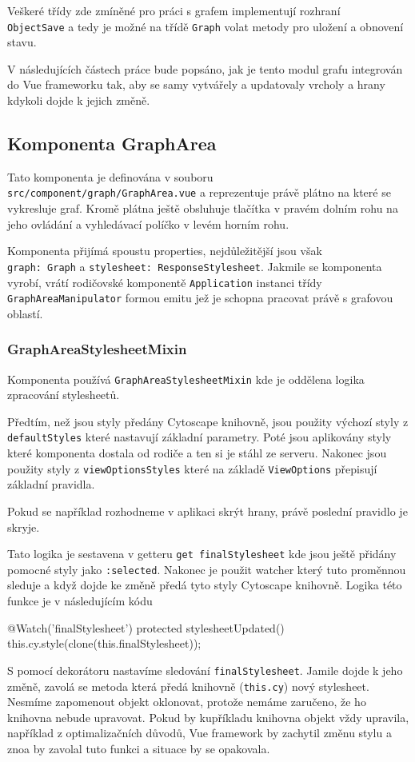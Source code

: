 \bigskip

Veškeré třídy zde zmíněné pro práci s grafem implementují rozhraní \\\texttt{ObjectSave} a tedy je možné na třídě \texttt{Graph} volat metody pro uložení a obnovení stavu.

\newpage

V následujících částech práce bude popsáno, jak je tento modul grafu integrován do Vue frameworku tak, aby se samy vytvářely a updatovaly vrcholy a hrany kdykoli dojde k jejich změně.

\subsection{Komponenta GraphArea}
Tato komponenta je definována v souboru \\\texttt{src/component/graph/GraphArea.vue} a reprezentuje právě plátno na které se vykresluje graf. Kromě plátna ještě obsluhuje tlačítka v pravém dolním rohu na jeho ovládání a vyhledávací políčko v levém horním rohu.

Komponenta přijímá spoustu properties, nejdůležitější jsou však \\\texttt{graph: Graph} a \texttt{stylesheet: ResponseStylesheet}. Jakmile se komponenta vyrobí, vrátí rodičovské komponentě \texttt{Application} instanci třídy \texttt{GraphAreaManipulator} formou emitu jež je schopna pracovat právě s grafovou oblastí.

\subsubsection{GraphAreaStylesheetMixin}

Komponenta používá \texttt{GraphAreaStylesheetMixin} kde je oddělena logika zpracování stylesheetů.

Předtím, než jsou styly předány Cytoscape knihovně, jsou použity výchozí styly z \texttt{defaultStyles} které nastavují základní parametry. Poté jsou aplikovány styly které komponenta dostala od rodiče a ten si je stáhl ze serveru. Nakonec jsou použity styly z \texttt{viewOptionsStyles} které na základě \texttt{ViewOptions} přepisují základní pravidla.

Pokud se například rozhodneme v aplikaci skrýt hrany, právě poslední pravidlo je skryje.

Tato logika je sestavena v getteru \texttt{get finalStylesheet} kde jsou ještě přidány pomocné styly jako \texttt{:selected}. Nakonec je použit watcher který tuto proměnnou sleduje a když dojde ke změně předá tyto styly Cytoscape knihovně. Logika této funkce je v následujícím kódu
\begin{code}
@Watch('finalStylesheet')
protected stylesheetUpdated() {
    this.cy.style(clone(this.finalStylesheet));
}
\end{code}
S pomocí dekorátoru nastavíme sledování \texttt{finalStylesheet}. Jamile dojde k jeho změně, zavolá se metoda která předá knihovně (\texttt{this.cy}) nový stylesheet. Nesmíme zapomenout objekt oklonovat, protože nemáme zaručeno, že ho knihovna nebude upravovat. Pokud by kupříkladu knihovna objekt vždy upravila, například z optimalizačních důvodů, Vue framework by zachytil změnu stylu a znoa by zavolal tuto funkci a situace by se opakovala.
